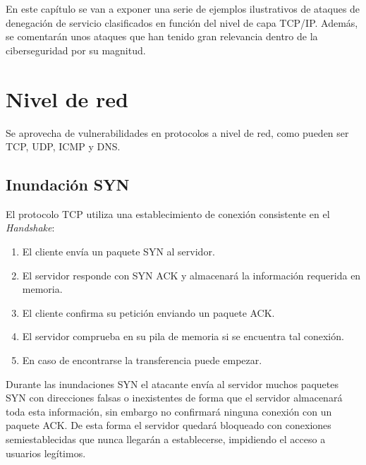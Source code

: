 En este capítulo se van a exponer una serie de ejemplos ilustrativos de ataques de denegación de servicio clasificados en función del nivel de capa TCP/IP. Además, se comentarán unos ataques que han tenido gran relevancia dentro de la ciberseguridad por su magnitud.

\section{Nivel de red}
Se aprovecha de vulnerabilidades en protocolos a nivel de red, como pueden ser TCP, UDP, ICMP y DNS. 

\subsection{Inundación SYN}
El protocolo TCP utiliza una establecimiento de conexión consistente en el \textit{Handshake}:
\begin{enumerate}
\item El cliente envía un paquete SYN al servidor.
\item El servidor responde con SYN ACK y almacenará la información requerida en memoria.
\item El cliente confirma su petición enviando un paquete ACK.
\item El servidor comprueba en su pila de memoria si se encuentra tal conexión. 
\item En caso de encontrarse la transferencia puede empezar.
\end{enumerate}

Durante las inundaciones SYN el atacante envía al servidor muchos paquetes SYN con direcciones falsas o inexistentes de forma que el servidor almacenará toda esta información, sin embargo no confirmará ninguna conexión con un paquete ACK. De esta forma el servidor quedará bloqueado con conexiones semiestablecidas que nunca llegarán a establecerse, impidiendo el acceso a usuarios legítimos\cite{synflood}.

